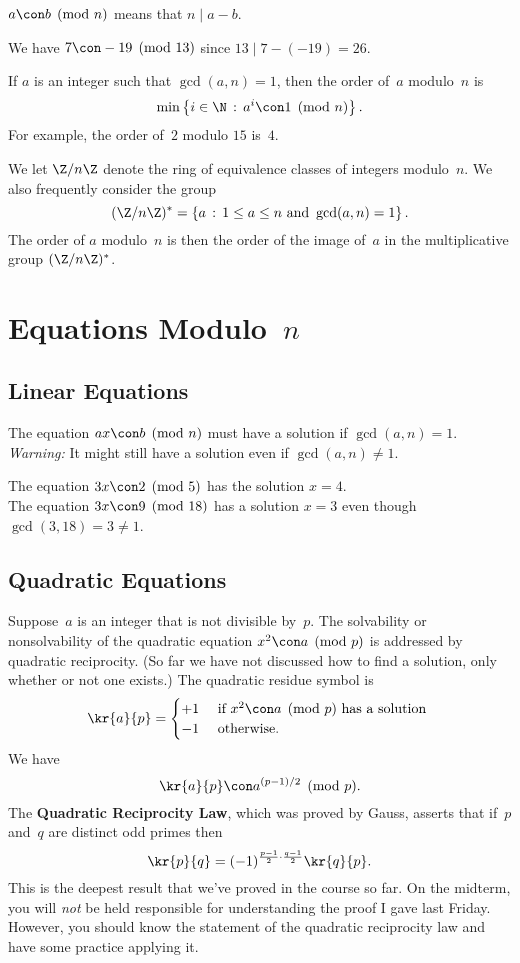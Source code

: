 \documentclass[11pt]{report}
\begin{document}
$a\con b\pmod{n}$ means that $n\mid a-b$.
\begin{example}
  We have $7\con -19\pmod{13}$ since $13\mid 7-(-19)=26$.
\end{example}

If $a$ is an integer such that $\gcd(a,n)=1$, then the order
of~$a$ modulo~$n$ is
$$\min\left\{ i\in\N  \,:\, a^i \con 1\pmod{n}\right\}.$$
For example, the order of~$2$ modulo $15$ is~$4$.

We let $\Z/n\Z$ denote the ring of equivalence classes of integers
modulo~$n$.  We also frequently consider the group
$$(\Z/n\Z)^* = \left\{ a \,:\, 1\leq a \leq n \text{ and }\gcd(a,n)=1\right\}.$$
The order of $a$ modulo~$n$ is then the order of the image of~$a$
in the multiplicative group $(\Z/n\Z)^*$.


\section{Equations Modulo~$n$}
\subsection{Linear Equations}
The equation $ax\con b\pmod{n}$ must have a solution if $\gcd(a,n)=1$.
  {\em Warning:} It might still have a solution even if $\gcd(a,n)\neq 1$.
\begin{example}
  The equation $3x\con 2\pmod{5}$ has the solution $x=4$.\\
  The equation $3x\con 9\pmod{18}$ has a solution $x=3$ even though
  $\gcd(3,18)=3\neq 1$.
\end{example}

\subsection{Quadratic Equations}
Suppose~$a$ is an integer that is not divisible by~$p$.  The
solvability or nonsolvability of the quadratic equation $x^2\con
  a\pmod{p}$ is addressed by quadratic reciprocity.  (So far we have
not discussed how to find a solution, only whether or not one exists.)
The quadratic residue symbol is
$$
  \kr{a}{p} = \begin{cases} +1 & \text{ if $x^2\con a\pmod{p}$ has a solution } \\
              -1 & \text{ otherwise}.
  \end{cases}
$$
We have
$$\kr{a}{p} \con a^{(p-1)/2} \pmod{p}.$$
The {\bf Quadratic Reciprocity Law}, which was proved by Gauss, asserts that
if~$p$ and~$q$ are distinct odd primes then
$$
  \kr{p}{q} = (-1)^{\frac{p-1}{2}\cdot\frac{q-1}{2}}\kr{q}{p}.
$$
This is the deepest result that we've proved in the course so far.  On
the midterm, you will {\em not} be held responsible for understanding
the proof I gave last Friday.   However, you should know the statement of
the quadratic reciprocity law and have some practice applying it.
\end{document}
